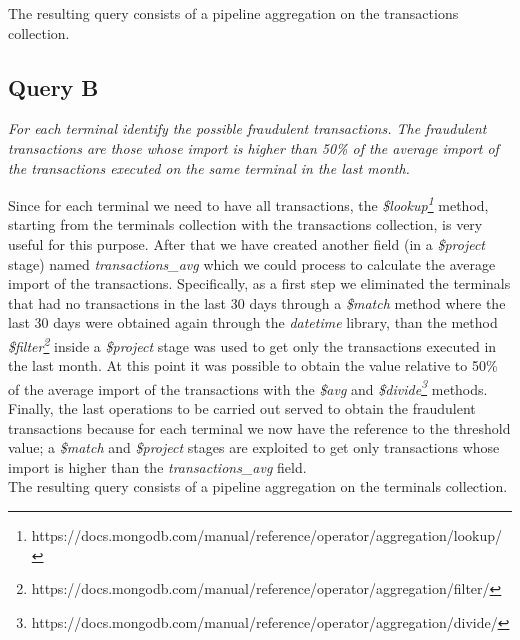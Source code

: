 \documentclass[runningheads]{llncs}
\begin{document}
The resulting query consists of a pipeline aggregation on the transactions collection.

\subsection{Query B}

\emph{For each terminal identify the possible fraudulent transactions. The fraudulent transactions
are those whose import is higher than 50\% of the average import of the transactions
executed on the same terminal in the last month.}

\hfill

\noindent
Since for each terminal we need to have all transactions, the \emph{\$lookup\footnote{https://docs.mongodb.com/manual/reference/operator/aggregation/lookup/}} method, starting from the terminals collection with the transactions collection, is very useful for this purpose. After that we have created another field (in a \emph{\$project} stage) named \emph{transactions\_avg} which we could process to calculate the average import of the transactions. Specifically, as a first step we eliminated the terminals that had no transactions in the last 30 days through a \emph{\$match} method where the last 30 days were obtained again through the \emph{datetime} library, than the method \emph{\$filter\footnote{https://docs.mongodb.com/manual/reference/operator/aggregation/filter/}} inside a \emph{\$project} stage was used to get only the transactions executed in the last month. At this point it was possible to obtain the value relative to 50\% of the average import of the transactions with the \emph{\$avg} and \emph{\$divide\footnote{https://docs.mongodb.com/manual/reference/operator/aggregation/divide/}} methods.\\
Finally, the last operations to be carried out served to obtain the fraudulent transactions because for each terminal we now have the reference to the threshold value; a \emph{\$match} and \emph{\$project} stages are exploited to get only transactions whose import is higher than the \emph{transactions\_avg} field.\\

The resulting query consists of a pipeline aggregation on the terminals collection.
\end{document}

